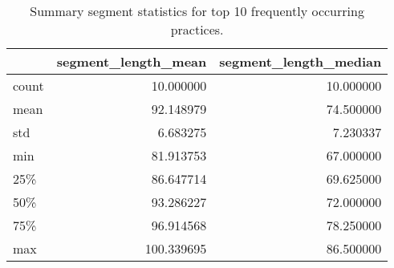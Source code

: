 \begin{table}[!ht]
	\centering
	\begin{tabular}{lrr}
	\toprule
	{} &  segment\_length\_mean &  segment\_length\_median \\
	\midrule
	count &            10.000000 &              10.000000 \\
	mean  &            92.148979 &              74.500000 \\
	std   &             6.683275 &               7.230337 \\
	min   &            81.913753 &              67.000000 \\
	25\%   &            86.647714 &              69.625000 \\
	50\%   &            93.286227 &              72.000000 \\
	75\%   &            96.914568 &              78.250000 \\
	max   &           100.339695 &              86.500000 \\
	\bottomrule
	\end{tabular}
	\caption{Summary segment statistics for top 10 frequently occurring practices.}
	\label{tab:top_10_practice_segment}
  \end{table}

